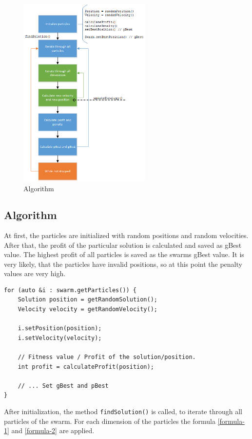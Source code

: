 \documentclass{article}
\begin{document}
\begin{figure}[H]
    \centering
    \includegraphics[width=250px]{images/algo.png}
    \caption{Algorithm}
    \label{fig-algo}
\end{figure}

\subsection{Algorithm}
At first, the particles are initialized with random positions and random velocities. After that, the profit of the particular solution is calculated and saved as gBest value. The highest profit of all particles is saved as the swarms gBest value. It is very likely, that the particles have invalid positions, so at this point the penalty values are very high.

\begin{lstlisting}[caption="Solver.cpp"]
for (auto &i : swarm.getParticles()) {
	Solution position = getRandomSolution();
   	Velocity velocity = getRandomVelocity();

	i.setPosition(position);
	i.setVelocity(velocity);
	
	// Fitness value / Profit of the solution/position.
	int profit = calculateProfit(position);
	
	// ... Set gBest and pBest
}
\end{lstlisting}

After initialization, the method \lstinline$findSolution()$ is called, to iterate through all particles of the swarm. For each dimension of the particles the formula \ref{formula-1} and \ref{formula-2} are applied.
\end{document}

